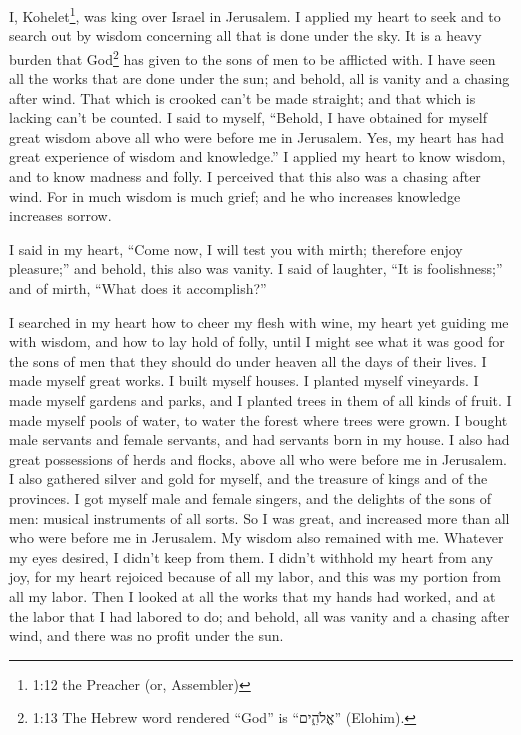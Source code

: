 \myverse{}I, Kohelet\footnote{1:12 the Preacher (or, Assembler)}, was king over Israel in Jerusalem. \myverse{}I applied my heart to seek and to search out by wisdom concerning all that is done under the sky. It is a heavy burden that God\footnote{1:13 The Hebrew word rendered “God” is “אֱלֹהִ֑ים” (Elohim).} has given to the sons of men to be afflicted with. \myverse{}I have seen all the works that are done under the sun; and behold, all is vanity and a chasing after wind. \myverse{}That which is crooked can’t be made straight; and that which is lacking can’t be counted. \myverse{}I said to myself, “Behold, I have obtained for myself great wisdom above all who were before me in Jerusalem. Yes, my heart has had great experience of wisdom and knowledge.” \myverse{}I applied my heart to know wisdom, and to know madness and folly. I perceived that this also was a chasing after wind. \myverse{}For in much wisdom is much grief; and he who increases knowledge increases sorrow.


\mychapter{} \myverse*{}I said in my heart, “Come now, I will test you with mirth; therefore
enjoy pleasure;” and behold, this also was vanity.
\myverse{}I said of laughter, “It is foolishness;” and of mirth, “What does it accomplish?”

\myverse{}I searched in my heart how to cheer my flesh with wine, my heart
yet guiding me with wisdom, and how to lay hold of folly, until I might see what it was good for the sons
of men that they should do under heaven all the days of their lives.
\myverse{}I made myself great works. I built myself houses. I planted myself vineyards.
\myverse{}I made myself gardens and parks, and I planted trees in them of all kinds of
fruit.
\myverse{}I made myself pools of water, to water the forest where trees were grown.
\myverse{}I bought male servants and female servants, and had servants born in my house.
I also had great possessions of herds and flocks, above all who were before me in Jerusalem.
\myverse{}I also gathered silver and gold for myself, and the treasure of kings and of
the provinces. I got myself male and female singers, and the delights of the sons of men: musical instruments
of all sorts.
\myverse{}So I was great, and increased more than all who were before me in Jerusalem.
My wisdom also remained with me.
\myverse{}Whatever my eyes desired, I didn’t keep from them. I didn’t withhold my heart
from any joy, for my heart rejoiced because of all my labor, and this was my portion from all my labor.
\myverse{}Then I looked at all the works that my hands had worked, and at the labor
that I had labored to do; and behold, all was vanity and a chasing after wind, and there was no profit
under the sun.

